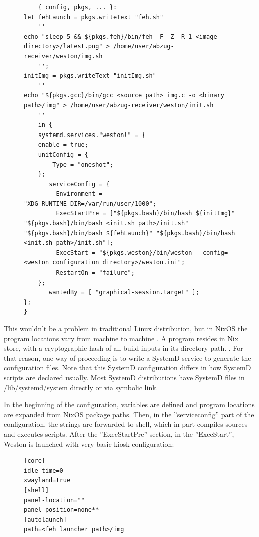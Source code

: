 \begin{figure}[H]
\begin{lstlisting} 
    { config, pkgs, ... }:
let fehLaunch = pkgs.writeText "feh.sh" 
    ''
echo "sleep 5 && ${pkgs.feh}/bin/feh -F -Z -R 1 <image directory>/latest.png" > /home/user/abzug-receiver/weston/img.sh
    '';
initImg = pkgs.writeText "initImg.sh" 
    ''
echo "${pkgs.gcc}/bin/gcc <source path> img.c -o <binary path>/img" > /home/user/abzug-receiver/weston/init.sh
    ''
    in {
    systemd.services."westonl" = {
	enable = true;
	unitConfig = {
		Type = "oneshot";
	};
	   serviceConfig = {
	     Environment = "XDG_RUNTIME_DIR=/var/run/user/1000"; 
	     ExecStartPre = ["${pkgs.bash}/bin/bash ${initImg}" "${pkgs.bash}/bin/bash <init.sh path>/init.sh" "${pkgs.bash}/bin/bash ${fehLaunch}" "${pkgs.bash}/bin/bash <init.sh path>/init.sh"];
	     ExecStart = "${pkgs.weston}/bin/weston --config=<weston configuration directory>/weston.ini";
	     RestartOn = "failure";
	};
	   wantedBy = [ "graphical-session.target" ];
};
}
\end{lstlisting}
\label{systemd1}
\end{figure}

This wouldn't be a problem in traditional Linux distribution, but in NixOS the program locations vary from machine to machine \cite{dolstra2010nixos}. A program resides in Nix store, with a cryptographic hash of all build inputs in its directory path. \cite{dolstra2010nixos}. For that reason, one way of proceeding is to write a SystemD service to generate the configuration files. Note that this SystemD configuration differs in how SystemD scripts are declared usually. Most SystemD distributions have SystemD files in /lib/systemd/system directly or via symbolic link.

In the beginning of the configuration, variables are defined and program locations are expanded from NixOS package paths. Then, in the ''serviceconfig'' part of the configuration, the strings are forwarded to shell, which in part compiles sources and executes scripts. After the ''ExecStartPre'' section, in the ''ExecStart'', Weston is launched with very basic kiosk configuration:

\begin{figure}
\begin{lstlisting} 
[core]
idle-time=0
xwayland=true
[shell]
panel-location=""
panel-position=none**
[autolaunch]
path=<feh launcher path>/img
\end{lstlisting}
\label{westonconf}
\end{figure}

